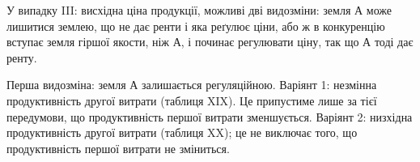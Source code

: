 У випадку III: висхідна ціна продукції, можливі дві видозміни: земля
А може лишитися землею, що не дає ренти і яка реґулює ціни, або ж в конкуренцію
вступає земля гіршої якости, ніж А, і починає регулювати ціну, так що А
тоді дає ренту.

Перша видозміна: земля А залишається регуляційною.
Варіянт 1: незмінна продуктивність другої витрати (таблиця XIX). Це припустиме
лише за тієї передумови, що продуктивність першої витрати
зменшується.
Варіянт 2: низхідна продуктивність другої витрати (таблиця XX); це не виключає
того, що продуктивність першої витрати не зміниться.
